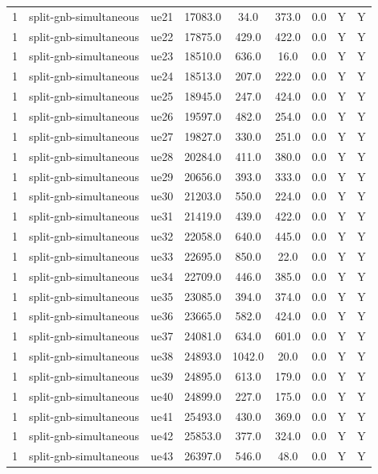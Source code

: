 \begin{table}[ht]
\begin{tabular}{|c|c|c|c|c|c|c|c|c|}
1 & split-gnb-simultaneous & ue21 & 17083.0 & 34.0 & 373.0 & 0.0 & Y & Y \\
1 & split-gnb-simultaneous & ue22 & 17875.0 & 429.0 & 422.0 & 0.0 & Y & Y \\
1 & split-gnb-simultaneous & ue23 & 18510.0 & 636.0 & 16.0 & 0.0 & Y & Y \\
1 & split-gnb-simultaneous & ue24 & 18513.0 & 207.0 & 222.0 & 0.0 & Y & Y \\
1 & split-gnb-simultaneous & ue25 & 18945.0 & 247.0 & 424.0 & 0.0 & Y & Y \\
1 & split-gnb-simultaneous & ue26 & 19597.0 & 482.0 & 254.0 & 0.0 & Y & Y \\
1 & split-gnb-simultaneous & ue27 & 19827.0 & 330.0 & 251.0 & 0.0 & Y & Y \\
1 & split-gnb-simultaneous & ue28 & 20284.0 & 411.0 & 380.0 & 0.0 & Y & Y \\
1 & split-gnb-simultaneous & ue29 & 20656.0 & 393.0 & 333.0 & 0.0 & Y & Y \\
1 & split-gnb-simultaneous & ue30 & 21203.0 & 550.0 & 224.0 & 0.0 & Y & Y \\
1 & split-gnb-simultaneous & ue31 & 21419.0 & 439.0 & 422.0 & 0.0 & Y & Y \\
1 & split-gnb-simultaneous & ue32 & 22058.0 & 640.0 & 445.0 & 0.0 & Y & Y \\
1 & split-gnb-simultaneous & ue33 & 22695.0 & 850.0 & 22.0 & 0.0 & Y & Y \\
1 & split-gnb-simultaneous & ue34 & 22709.0 & 446.0 & 385.0 & 0.0 & Y & Y \\
1 & split-gnb-simultaneous & ue35 & 23085.0 & 394.0 & 374.0 & 0.0 & Y & Y \\
1 & split-gnb-simultaneous & ue36 & 23665.0 & 582.0 & 424.0 & 0.0 & Y & Y \\
1 & split-gnb-simultaneous & ue37 & 24081.0 & 634.0 & 601.0 & 0.0 & Y & Y \\
1 & split-gnb-simultaneous & ue38 & 24893.0 & 1042.0 & 20.0 & 0.0 & Y & Y \\
1 & split-gnb-simultaneous & ue39 & 24895.0 & 613.0 & 179.0 & 0.0 & Y & Y \\
1 & split-gnb-simultaneous & ue40 & 24899.0 & 227.0 & 175.0 & 0.0 & Y & Y \\
1 & split-gnb-simultaneous & ue41 & 25493.0 & 430.0 & 369.0 & 0.0 & Y & Y \\
1 & split-gnb-simultaneous & ue42 & 25853.0 & 377.0 & 324.0 & 0.0 & Y & Y \\
1 & split-gnb-simultaneous & ue43 & 26397.0 & 546.0 & 48.0 & 0.0 & Y & Y \\

\end{tabular}
\end{table}

